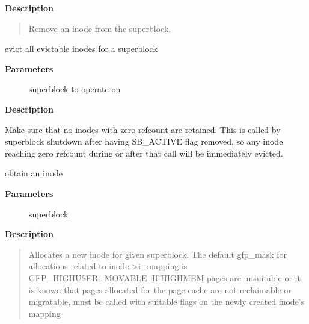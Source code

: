 \documentclass[a4paper,8pt,english]{sphinxmanual}
\begin{document}
\textbf{Description}
\begin{quote}

Remove an inode from the superblock.
\end{quote}

\begin{fulllineitems}
\label{filesystems/index:c.evict_inodes}
evict all evictable inodes for a superblock

\end{fulllineitems}


\textbf{Parameters}
\begin{description}
\item[{}] \leavevmode
superblock to operate on

\end{description}

\textbf{Description}

Make sure that no inodes with zero refcount are retained.  This is
called by superblock shutdown after having SB\_ACTIVE flag removed,
so any inode reaching zero refcount during or after that call will
be immediately evicted.

\begin{fulllineitems}
\label{filesystems/index:c.new_inode}
obtain an inode

\end{fulllineitems}


\textbf{Parameters}
\begin{description}
\item[{}] \leavevmode
superblock

\end{description}

\textbf{Description}
\begin{quote}

Allocates a new inode for given superblock. The default gfp\_mask
for allocations related to inode-\textgreater{}i\_mapping is GFP\_HIGHUSER\_MOVABLE.
If HIGHMEM pages are unsuitable or it is known that pages allocated
for the page cache are not reclaimable or migratable,
 must be called with suitable flags on the
newly created inode's mapping
\end{quote}
\end{document}
